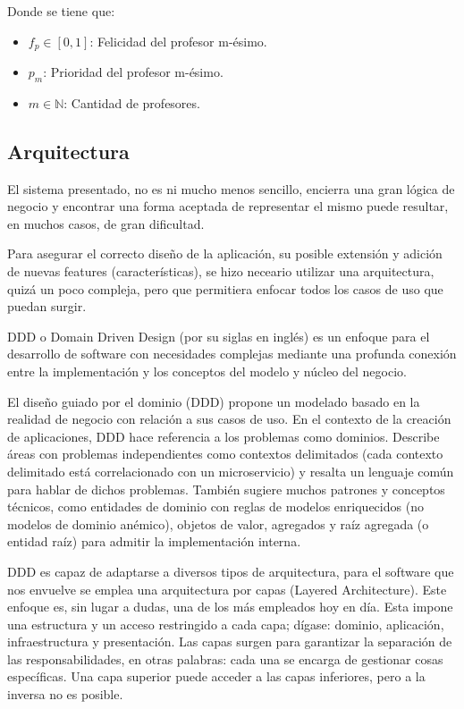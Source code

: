 \noindent Donde se tiene que:
\begin{itemize}
	\item $f_p \in [0, 1]$: Felicidad del profesor m-ésimo.
	\item $p_m$: Prioridad del profesor m-ésimo.
	\item $m \in \mathbb{N}$: Cantidad de profesores.
\end{itemize}


\subsection{Arquitectura}

El  sistema presentado, no es ni mucho menos sencillo, encierra una gran lógica de negocio y encontrar una forma aceptada de representar el mismo puede resultar, en muchos casos, de gran dificultad.

Para asegurar el correcto diseño de la aplicación, su posible extensión y adición de nuevas features (características), se hizo neceario utilizar una arquitectura, quizá un poco compleja, pero que permitiera enfocar todos los casos de uso que puedan surgir. 

DDD o Domain Driven Design (por su siglas en inglés) es un enfoque para el desarrollo de software con necesidades complejas mediante una profunda conexión entre la implementación y los conceptos del modelo y núcleo del negocio.\cite{ddd_wiki}

El diseño guiado por el dominio (DDD) propone un modelado basado en la realidad de negocio con relación a sus casos de uso. En el contexto de la creación de aplicaciones, DDD hace referencia a los problemas como dominios. Describe áreas con problemas independientes como contextos delimitados (cada contexto delimitado está correlacionado con un microservicio) y resalta un lenguaje común para hablar de dichos problemas. También sugiere muchos patrones y conceptos técnicos, como entidades de dominio con reglas de modelos enriquecidos (no modelos de dominio anémico), objetos de valor, agregados y raíz agregada (o entidad raíz) para admitir la implementación interna.\cite{ddd_dotnet}

DDD es capaz de adaptarse a diversos tipos de arquitectura, para el software que nos envuelve se emplea una arquitectura por capas (Layered Architecture). Este enfoque es, sin lugar a dudas, una de los más empleados hoy en día. Esta impone una estructura y un acceso restringido a cada capa; dígase: dominio, aplicación, infraestructura y presentación. Las capas surgen para garantizar la separación de las responsabilidades, en otras palabras: cada una se encarga de gestionar cosas específicas. Una capa superior puede acceder a las capas inferiores, pero a la inversa no es posible.


